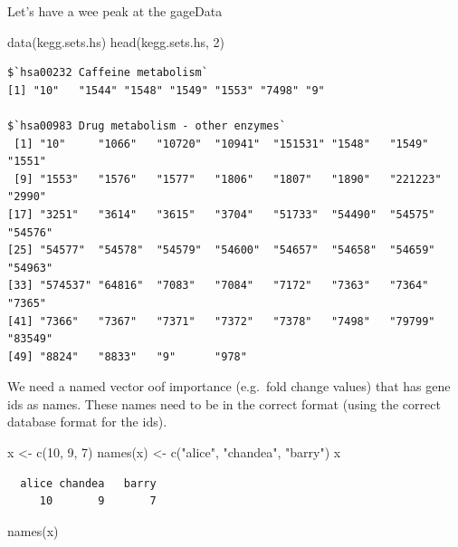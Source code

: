 \documentclass[
  letterpaper,
  DIV=11,
  numbers=noendperiod]{scrartcl}
\newenvironment{Shaded}{\begin{snugshade}}{\end{snugshade}}
\newcommand{\DecValTok}[1]{\textcolor[rgb]{0.68,0.00,0.00}{#1}}
\newcommand{\FunctionTok}[1]{\textcolor[rgb]{0.28,0.35,0.67}{#1}}
\newcommand{\NormalTok}[1]{\textcolor[rgb]{0.00,0.23,0.31}{#1}}
\newcommand{\OtherTok}[1]{\textcolor[rgb]{0.00,0.23,0.31}{#1}}
\newcommand{\StringTok}[1]{\textcolor[rgb]{0.13,0.47,0.30}{#1}}
\begin{document}
Let's have a wee peak at the gageData

\begin{Shaded}
\begin{Highlighting}[]
\FunctionTok{data}\NormalTok{(kegg.sets.hs)}
\FunctionTok{head}\NormalTok{(kegg.sets.hs, }\DecValTok{2}\NormalTok{)}
\end{Highlighting}
\end{Shaded}

\begin{verbatim}
$`hsa00232 Caffeine metabolism`
[1] "10"   "1544" "1548" "1549" "1553" "7498" "9"   

$`hsa00983 Drug metabolism - other enzymes`
 [1] "10"     "1066"   "10720"  "10941"  "151531" "1548"   "1549"   "1551"  
 [9] "1553"   "1576"   "1577"   "1806"   "1807"   "1890"   "221223" "2990"  
[17] "3251"   "3614"   "3615"   "3704"   "51733"  "54490"  "54575"  "54576" 
[25] "54577"  "54578"  "54579"  "54600"  "54657"  "54658"  "54659"  "54963" 
[33] "574537" "64816"  "7083"   "7084"   "7172"   "7363"   "7364"   "7365"  
[41] "7366"   "7367"   "7371"   "7372"   "7378"   "7498"   "79799"  "83549" 
[49] "8824"   "8833"   "9"      "978"   
\end{verbatim}

We need a named vector oof importance (e.g.~fold change values) that has
gene ids as names. These names need to be in the correct format (using
the correct database format for the ids).

\begin{Shaded}
\begin{Highlighting}[]
\NormalTok{x }\OtherTok{\textless{}{-}} \FunctionTok{c}\NormalTok{(}\DecValTok{10}\NormalTok{, }\DecValTok{9}\NormalTok{, }\DecValTok{7}\NormalTok{)}
\FunctionTok{names}\NormalTok{(x) }\OtherTok{\textless{}{-}} \FunctionTok{c}\NormalTok{(}\StringTok{"alice"}\NormalTok{, }\StringTok{"chandea"}\NormalTok{, }\StringTok{"barry"}\NormalTok{)}
\NormalTok{x}
\end{Highlighting}
\end{Shaded}

\begin{verbatim}
  alice chandea   barry 
     10       9       7 
\end{verbatim}

\begin{Shaded}
\begin{Highlighting}[]
\FunctionTok{names}\NormalTok{(x)}
\end{Highlighting}
\end{Shaded}
\end{document}
